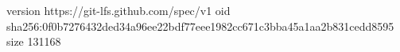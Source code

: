 version https://git-lfs.github.com/spec/v1
oid sha256:0f0b7276432ded34a96ee22bdf77eee1982cc671c3bba45a1aa2b831cedd8595
size 131168
